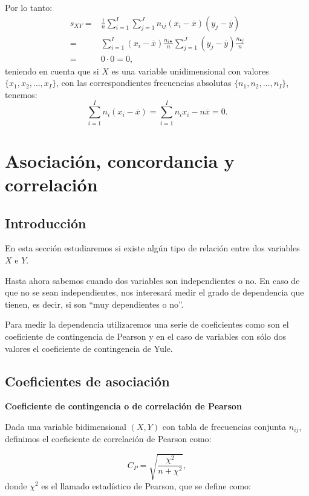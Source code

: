 \documentclass[12pt]{report}
\begin{document}
Por lo tanto:
$$
\begin{array}{rl}
s_{XY}=&\frac{1}{n}\sum\limits_{i=1}^I\sum\limits_{j=1}^{J}
n_{ij}\left(x_i-\overline{x}\right) \left(y_j-\overline{y}\right)\\
=&\sum\limits_{i=1}^I\left(x_i-\overline{x}\right)\frac{n_{i\bullet}}{n}
\sum\limits_{j=1}^J\left(y_j-\overline{y}\right)\frac{n_{\bullet j}}{n} \\ = & 0 \cdot 0
=0,
\end{array}
$$
teniendo en cuenta que si $X$ es una variable unidimensional con valores
\newline $\{x_1,x_2,\ldots, x_I\}$, con las correspondientes frecuencias
absolutas $\{n_1,n_2,\ldots, n_I\}$, tenemos:
$$
\sum\limits_{i=1}^I n_i\left(x_i-\overline{x}\right)= \sum\limits_{i=1}^I n_ix_i -
n\overline{x}=0.$$


\section{Asociación, concordancia y correlación}

\subsection{Introducción}

En esta sección estudiaremos si existe algún tipo de relación entre dos variables $X$ e
$Y$.

Hasta ahora sabemos cuando dos variables son independientes o no. En caso de  que no se sean
independientes,  nos interesará medir el grado de dependencia que tienen, es decir, si
son ``muy dependientes o no''.

Para medir la dependencia utilizaremos una serie de coeficientes como son  el coeficiente
de contingencia de Pearson y  en el caso de variables con sólo dos valores el coeficiente de contingencia de Yule.


\subsection{Coeficientes de asociación}

{\bf Coeficiente de contingencia o de correlación de Pearson}

Dada una variable bidimensional $(X,Y)$ con tabla de frecuencias conjunta $n_{ij}$,
definimos el coeficiente de correlación de Pearson como:

$$C_P= \sqrt{\frac{\chi^2}{n+\chi^2}},$$
donde $\chi^2$ es el llamado estadístico de Pearson, que se define como:
\end{document}
